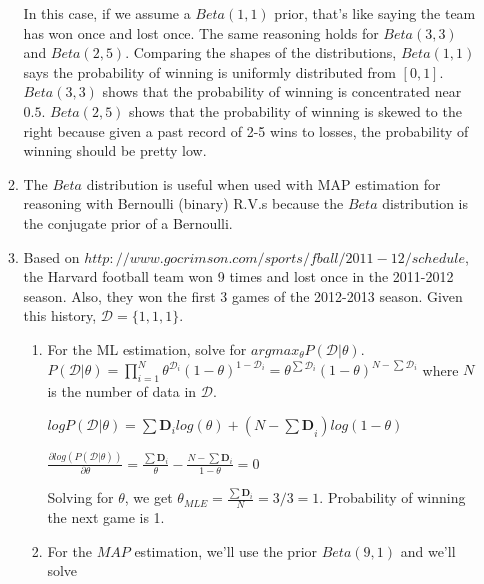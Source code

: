 \documentclass[12pt,letterpaper]{article}
\newcounter{partnumber}
\newcommand{\Part}{\stepcounter{partnumber}\item[(\alph{partnumber})]}
\begin{document}
\begin{enumerate}
\begin{enumerate}
In this case, if we assume a $Beta(1,1)$ prior, that's like saying the team has won once and lost once. The same reasoning holds
         for $Beta(3,3)$ and $Beta(2,5)$. Comparing the shapes of the distributions, $Beta(1,1)$ says the probability of winning is uniformly distributed from $[0,1]$. $Beta(3,3)$ shows 
         that the probability of winning is concentrated near $0.5$. $Beta(2,5)$ shows that the probability of winning is skewed to the right because given a past record of 2-5 wins to losses, the probability of winning
        should be pretty low. 
        \Part The $Beta$ distribution is useful when used with MAP estimation for reasoning with Bernoulli (binary) R.V.s because the $Beta$ distribution is the conjugate prior 
        of a Bernoulli. \medskip
        \Part Based on $http://www.gocrimson.com/sports/fball/2011-12/schedule$, the Harvard football team won 9 times and lost once in the 2011-2012 season. Also, they won  the first 3 games of the 2012-2013 season. Given this history, $\mathcal{D} = \{1,1,1\}$.\medskip
        
                \begin{enumerate}[ref=(\roman{*})]
                 \item For the ML estimation, solve for $argmax_{\theta} P(\mathcal{D}|\theta).$   \medskip \\
        
            $P(\mathcal{D}|\theta) = \displaystyle \prod_{i=1}^{N} \theta^{\mathcal{D}_i}(1-\theta)^{1-\mathcal{D}_i}= \theta^{\sum\mathcal{D}_i}  (1-\theta)^{N-\sum\mathcal{D}_i}  $ where $N$ is the number of data in $\mathcal{D}$. \medskip
            
            $ log P(\mathcal{D}|\theta)  = \displaystyle \sum{\boldsymbol{D}_i}log(\theta) +\displaystyle (N-\boldsymbol{\sum D}_i)log(1-\theta)$\medskip
            
            $  \displaystyle\frac{\partial{log(P(\mathcal{D}|\theta))}}{\partial{\theta}} =  \displaystyle \frac{\sum{\boldsymbol{D}_i}}{\theta} -  \frac{N-\sum{\boldsymbol{D}_i}}{1- \theta} = 0$ \medskip 
            
            Solving for $\theta$, we get $\theta_{MLE} = \displaystyle \frac{\sum{\boldsymbol{D}_i}}{N} = 3/3 = 1.  $ Probability of winning the next game is 1. \medskip \\
            
        
                \item For the $MAP$  estimation, we'll use the prior $Beta(9,1)$ and we'll solve \medskip
                

\end{enumerate}
\end{enumerate}
\end{enumerate}
\end{document}
